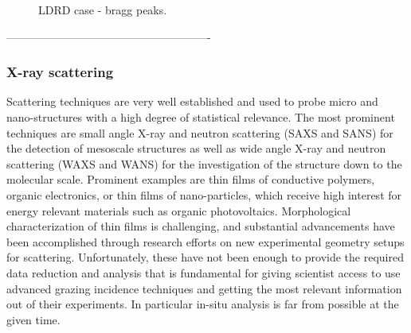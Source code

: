 \begin{figure}[!t]
\centering
{}
\hfil
{}
\caption{LDRD case - bragg peaks.}
\label{fig:ldrd}
\end{figure}

-------------------------------------------------------
\subsubsection{X-ray scattering}\label{subsec:gisaxs} %
Scattering techniques are very well established and used to probe micro and nano-structures with a high degree of statistical relevance. The most prominent techniques are small angle X-ray and neutron scattering (SAXS and SANS) for the detection of mesoscale structures as well as wide angle X-ray and neutron scattering (WAXS and WANS) for the investigation of the structure down to the molecular scale. Prominent examples are thin films of conductive polymers, organic electronics, or thin films of nano-particles, which receive high interest for energy relevant materials such as organic photovoltaics. Morphological characterization of thin films is challenging, and substantial advancements have been accomplished through research efforts on new experimental geometry setups for scattering. Unfortunately, these have not been enough to provide the required data reduction and analysis that is fundamental for giving scientist access to use advanced grazing incidence techniques and getting the most relevant information out of their experiments. In particular in-situ analysis is far from possible at the given time.

